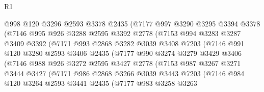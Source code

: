 \begin{lexlean}{R1}
\begin{coremodule}
                  @998
                  @120
                  @3296
                  @2593
                  @3378
                  @2435
                  (@7177
                    @997
                    @3290
                    @3295
                    @3394
                    @3378
                    (@7146
                      @995
                      @926
                      @3288
                      @2595
                      @3392
                      @2778
                      (@7153
                        @994
                        @3283
                        @3287
                        @3409
                        @3392
                        (@7171
                          @993
                          @2868
                          @3282
                          @3039
                          @3408
                          @7203
                          (@7146
                            @991
                            @120
                            @3280
                            @2593
                            @3406
                            @2435
                            (@7177
                              @990
                              @3274
                              @3279
                              @3429
                              @3406
                              (@7146
                                @988
                                @926
                                @3272
                                @2595
                                @3427
                                @2778
                                (@7153
                                  @987
                                  @3267
                                  @3271
                                  @3444
                                  @3427
                                  (@7171
                                    @986
                                    @2868
                                    @3266
                                    @3039
                                    @3443
                                    @7203
                                    (@7146
                                      @984
                                      @120
                                      @3264
                                      @2593
                                      @3441
                                      @2435
                                      (@7177
                                        @983
                                        @3258
                                        @3263

\end{coremodule}
\end{lexlean}

